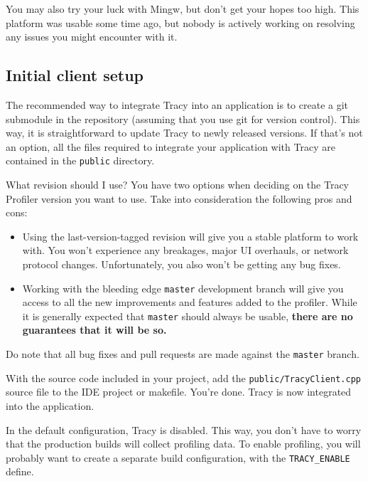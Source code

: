 \documentclass[hidelinks,titlepage,a4paper,twoside]{article}
\begin{document}
You may also try your luck with Mingw, but don't get your hopes too high. This platform was usable some time ago, but nobody is actively working on resolving any issues you might encounter with it.

\subsection{Initial client setup}
\label{initialsetup}

The recommended way to integrate Tracy into an application is to create a git submodule in the repository (assuming that you use git for version control). This way, it is straightforward to update Tracy to newly released versions. If that's not an option, all the files required to integrate your application with Tracy are contained in the \texttt{public} directory.

\begin{bclogo}[
noborder=true,
couleur=black!5,
logo=\bclampe
]{What revision should I use?}
You have two options when deciding on the Tracy Profiler version you want to use. Take into consideration the following pros and cons:

\begin{itemize}
\item Using the last-version-tagged revision will give you a stable platform to work with. You won't experience any breakages, major UI overhauls, or network protocol changes. Unfortunately, you also won't be getting any bug fixes.
\item Working with the bleeding edge \texttt{master} development branch will give you access to all the new improvements and features added to the profiler. While it is generally expected that \texttt{master} should always be usable, \textbf{there are no guarantees that it will be so.}
\end{itemize}

Do note that all bug fixes and pull requests are made against the \texttt{master} branch.
\end{bclogo}

With the source code included in your project, add the \texttt{public/TracyClient.cpp} source file to the IDE project or makefile. You're done. Tracy is now integrated into the application.

In the default configuration, Tracy is disabled. This way, you don't have to worry that the production builds will collect profiling data. To enable profiling, you will probably want to create a separate build configuration, with the \texttt{TRACY\_ENABLE} define.
\end{document}
